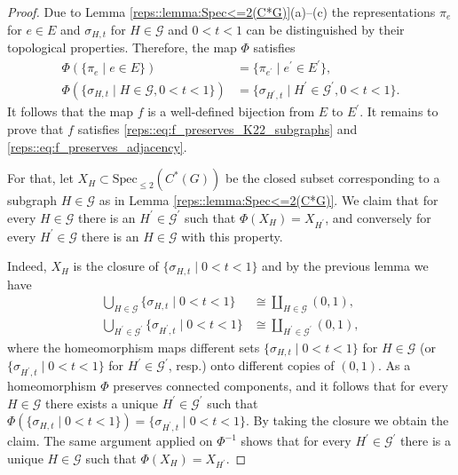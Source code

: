 \documentclass[a4paper]{amsart}
\begin{document}
\begin{proof}
    Due to Lemma \ref{reps::lemma:Spec<=2(C*G)}(a)--(c) the representations $\pi_e$ for $e \in E$ and $\sigma_{H,t}$ for $H \in \mathcal{G}$ and $0 < t < 1$ can be distinguished by their topological properties. Therefore, the map $\Phi$ satisfies
    \begin{align*}
        \Phi\left( \{ \pi_e \mid e \in E\} \right) &= \{ \pi_{e^\prime} \mid e^\prime \in E^\prime\}, \\
        \Phi\left( \{ \sigma_{H,t} \mid H \in \mathcal{G}, 0 < t < 1\} \right) &= \{ \sigma_{H^\prime, t} \mid H^\prime \in \mathcal{G}^\prime, 0 < t < 1\}.
    \end{align*}
    It follows that the map $f$ is a well-defined bijection from $E$ to $E^\prime$. It remains to prove that $f$ satisfies \eqref{reps::eq:f_preserves_K22_subgraphs} and \eqref{reps::eq:f_preserves_adjacency}.

    For that, let $X_H \subset \mathrm{Spec}_{\leq 2}(C^\ast(G))$ be the closed subset corresponding to a subgraph $H \in \mathcal{G}$ as in Lemma \ref{reps::lemma:Spec<=2(C*G)}. We claim that for every $H \in \mathcal{G}$ there is an $H^\prime \in \mathcal{G}^\prime$ such that $\Phi(X_H) = X_{H^\prime}$, and conversely for every $H^\prime \in \mathcal{G}$ there is an $H \in \mathcal{G}$ with this property.
    
    Indeed, $X_H$ is the closure of $\{\sigma_{H,t} \mid 0 < t < 1\}$ and by the previous lemma we have 
    \begin{align*}
        \bigcup_{H \in \mathcal{G}} \{\sigma_{H,t} \mid 0 < t < 1\} & \cong \coprod_{H \in \mathcal{G}} (0,1), \\
        \bigcup_{H^\prime \in \mathcal{G}^\prime} \{\sigma_{H^\prime, t} \mid 0 < t <1\} & \cong \coprod_{H^\prime \in \mathcal{G}^\prime} (0,1),
    \end{align*}
    where the homeomorphism maps different sets $\{\sigma_{H,t} \mid 0 < t < 1\}$ for $H \in \mathcal{G}$ (or $\{\sigma_{H^\prime, t} \mid 0 < t < 1\}$ for $H^\prime \in \mathcal{G}^\prime$, resp.) onto different copies of $(0,1)$.
    As a homeomorphism $\Phi$ preserves connected components, and it follows that for every $H \in \mathcal{G}$ there exists a unique $H^\prime \in \mathcal{G}^\prime$ such that $\Phi\left( \{ \sigma_{H,t} \mid 0 < t < 1\} \right) = \{ \sigma_{H^\prime, t} \mid 0 < t < 1\}$. By taking the closure we obtain the claim. The same argument applied on $\Phi^{-1}$ shows that for every $H^\prime \in \mathcal{G}^\prime$ there is a unique $H \in \mathcal{G}$ such that $\Phi(X_H) = X_{H^\prime}$.


\end{proof}
\end{document}
